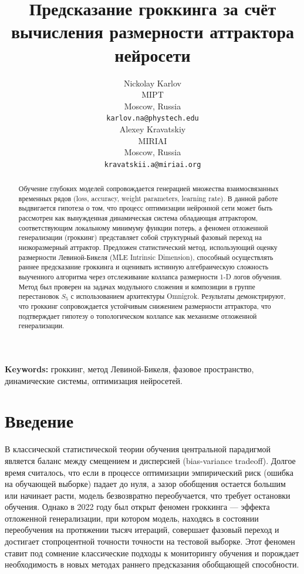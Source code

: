 \documentclass{article}
\title{Предсказание гроккинга за счёт вычисления размерности аттрактора нейросети}
\author{
  Nickolay Karlov\\
  MIPT\\
  Moscow, Russia\\
  \texttt{karlov.na@phystech.edu}\\
  \And
  Alexey Kravatskiy\\
  MIRIAI\\
  Moscow, Russia\\
  \texttt{kravatskii.a@miriai.org}\\
}
\begin{document}
\maketitle

\begin{abstract}
    Обучение глубоких моделей сопровождается генерацией множества взаимосвязанных временных рядов (loss, accuracy, weight parameters, learning rate). В данной работе выдвигается гипотеза о том, что процесс оптимизации нейронной сети может быть рассмотрен как вынужденная динамическая система обладающая аттрактором, соответствующим локальному минимуму функции потерь, а феномен отложенной генерализации (гроккинг) представляет собой структурный фазовый переход на низкоразмерный аттрактор. Предложен статистический метод, использующий оценку размерности Левиной-Бикеля (MLE Intrinsic Dimension), способный осуществлять раннее предсказание гроккинга и оценивать истинную алгебраическую сложность выученного алгоритма через отслеживание коллапса размерности 1-D логов обучения. Метод был проверен на задачах модульного сложения и композиции в группе перестановок $S_5$ с использованием архитектуры Omnigrok. Результаты демонстрируют, что гроккинг сопровождается устойчивым снижением размерности аттрактора, что подтверждает гипотезу о топологическом коллапсе как механизме отложенной генерализации.
\end{abstract}

\textbf{Keywords:} гроккинг, метод Левиной-Бикеля, фазовое пространство, динамические системы, оптимизация нейросетей.

\section{Введение}\label{sec:intro}


В классической статистической теории обучения центральной парадигмой является баланс между смещением и дисперсией (bias-variance tradeoff). Долгое время считалось, что если в процессе оптимизации эмпирический риск (ошибка на обучающей выборке) падает до нуля, а зазор обобщения остается большим или начинает расти, модель безвозвратно переобучается, что требует остановки обучения. Однако в 2022 году был открыт феномен гроккинга \cite{power2022grokking} — эффекта отложенной генерализации, при котором модель, находясь в состоянии переобучения на протяжении тысяч итераций, совершает фазовый переход и достигает стопроцентной точности точности на тестовой выборке. Этот феномен ставит под сомнение классические подходы к мониторингу обучения и порождает необходимость в новых методах раннего предсказания обобщающей способности.
\end{document}
